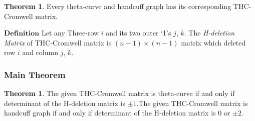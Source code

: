 \documentclass{article}
\theoremstyle{definition}
\theoremstyle{theorem}
\newtheorem{theorem}[thm]{Theorem}
\theoremstyle{proposition}
\theoremstyle{corollary}
\begin{document}
\begin{theorem}
Every theta-curve and handcuff graph has its corresponding THC-Cromwell matrix.
\end{theorem}
$\mathbf{Definition}$ Let any Three-row $i$ and its two outer `1's $j$, $k$. The \textit{H-deletion Matrix} of THC-Cromwell matrix is $(n-1)\times(n-1)$ matrix which deleted row $i$ and column $j$, $k$.\\

\subsubsection{Main Theorem}
\begin{theorem}The given THC-Cromwell matrix is theta-curve if and only if determinant of the H-deletion matrix is $\pm 1$.The given THC-Cromwell matrix is handcuff graph if and only if determinant of the H-deletion matrix is 0 or $\pm 2$.
\end{theorem}
\end{document}
